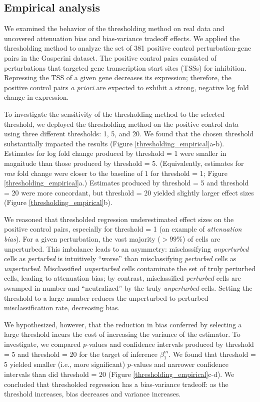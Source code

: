 \documentclass[12pt]{article}
\begin{document}
\subsection{Empirical analysis}

We examined the behavior of the thresholding method on real data and uncovered attenuation bias and bias-variance tradeoff effects. We applied the thresholding method to analyze the set of 381 positive control perturbation-gene pairs in the Gasperini dataset. The positive control pairs consisted of perturbations that targeted gene transcription start sites (TSSs) for inhibition. Repressing the TSS of a given gene decreases its expression; therefore, the positive control pairs \textit{a priori} are expected to exhibit a strong, negative log fold change in expression.

To investigate the sensitivity of the thresholding method to the selected threshold, we deployed the thresholding method on the positive control data using three different thresholds: 1, 5, and 20. We found that the chosen threshold substantially impacted the results (Figure \ref{thresholding_empirical}a-b). Estimates for log fold change produced by threshold = 1 were smaller in magnitude than those produced by threshold = 5. (Equivalently, estimates for \textit{raw} fold change were closer to the baseline of $1$ for threshold = 1; Figure \ref{thresholding_empirical}a.) Estimates produced by threshold = 5 and threshold = 20 were more concordant, but threshold = 20 yielded slightly larger effect sizes (Figure \ref{thresholding_empirical}b).

We reasoned that thresholded regression underestimated effect sizes on the positive control pairs, especially for threshold = 1 (an example of \textit{attenuation bias}). For a given perturbation, the vast majority ($>99\%$) of cells are unperturbed. This imbalance leads to an asymmetry: misclassifying \textit{unperturbed} cells as \textit{perturbed} is intuitively ``worse'' than misclassifying \textit{perturbed} cells as \textit{unperturbed}. Misclassified \textit{unperturbed} cells contaminate the set of truly perturbed cells, leading to attenuation bias; by contrast, misclassified \textit{perturbed} cells are swamped in number and ``neutralized'' by the truly \textit{unperturbed} cells. Setting the threshold to a large number reduces the unperturbed-to-perturbed misclassification rate, decreasing bias.

We hypothesized, however, that the reduction in bias conferred by selecting a large threshold incurs the cost of increasing the variance of the estimator. To investigate, we compared $p$-values and confidence intervals produced by threshold = 5 and threshold = 20 for the target of inference $\beta^m_1$. We found that threshold = 5 yielded smaller (i.e., more significant) $p$-values and narrower confidence intervals than did threshold = 20 (Figure \ref{thresholding_empirical}c-d). We concluded that thresholded regression has a bias-variance tradeoff: as the threshold increases, bias decreases and variance increases.
\end{document}
